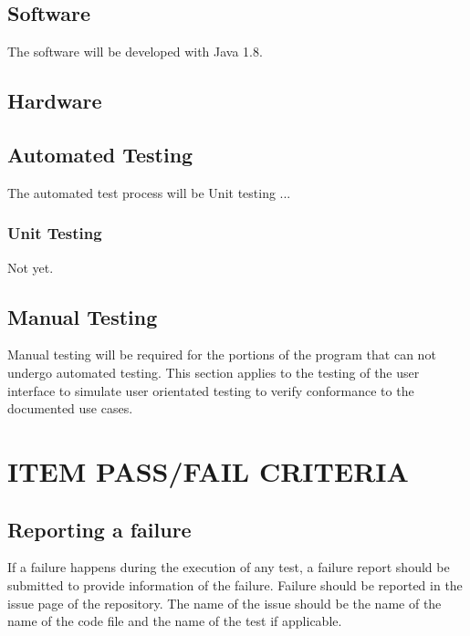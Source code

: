 {{\subsection{Software}
The software will be developed with Java 1.8.

\subsection{Hardware}

\subsection{Automated Testing}
The automated test process will be Unit testing ...
\subsubsection{Unit Testing}
Not yet.

\subsection{Manual Testing}
Manual testing will be required for the portions of the program that can not undergo  automated testing. This section applies to the testing of the user interface to simulate user orientated testing to verify conformance to the documented use cases.
}

\section[ITEM PASS/FAIL CRITERIA]{\bfseries\color{black}
	 ITEM PASS/FAIL CRITERIA}
{\color{black}
\subsection{Reporting a failure}
If a failure happens during the execution of any test, a failure report should be submitted to provide information of the failure. Failure should be reported in the issue page of the repository.
\newline
The name of the issue should be the name of the name of the code file and the name of the test if applicable.

}}
